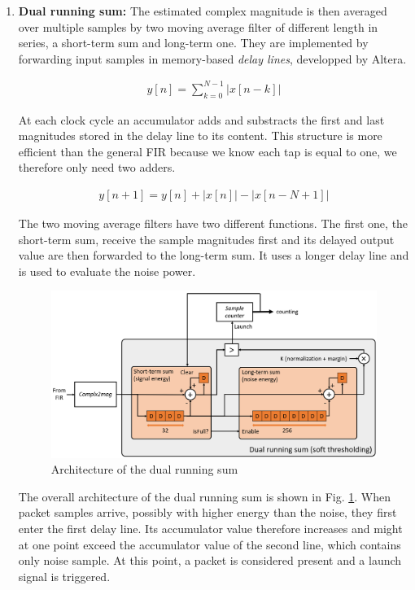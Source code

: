 \begin{enumerate}
    \item \textbf{Dual running sum: } The estimated complex magnitude is then averaged over multiple samples by two moving average filter of different length in series, a short-term sum and long-term one. They are implemented by forwarding input samples in  memory-based \textit{delay lines}, developped by Altera. 

    \begin{align}
            y[n] = \sum_{k=0}^{N-1}\left|x[n-k]\right|
    \end{align}

    At each clock cycle an accumulator adds and substracts the first and last magnitudes stored in the delay line to its content. This structure is more efficient than the general FIR because we know each tap is equal to one, we therefore only need two adders. 

    \begin{align}
            y[n+1] = y[n] + \left|x[n]\right| - \left|x[n-N+1]\right|
    \end{align}

    The two moving average filters have two different functions. The first one, the short-term sum, receive the sample magnitudes first and its delayed output value are then forwarded to the long-term sum. It uses a longer delay line and is used to evaluate the noise power. 

    \begin{figure}[h]
        \centering
        \includegraphics[width=\linewidth]{figures/dual_running_sum_block.png}
        \caption{Architecture of the dual running sum}
        \label{fig:dual_runnign_sum}
    \end{figure}
    
    The overall architecture of the dual running sum is shown in Fig. \ref{fig:dual_runnign_sum}. When packet samples arrive, possibly with  higher energy than the noise, they first enter the first delay line. Its accumulator value therefore increases and might at one point exceed the accumulator value of the second line, which contains only noise sample. At this point, a packet is considered present and a launch signal is triggered. 


\end{enumerate}
